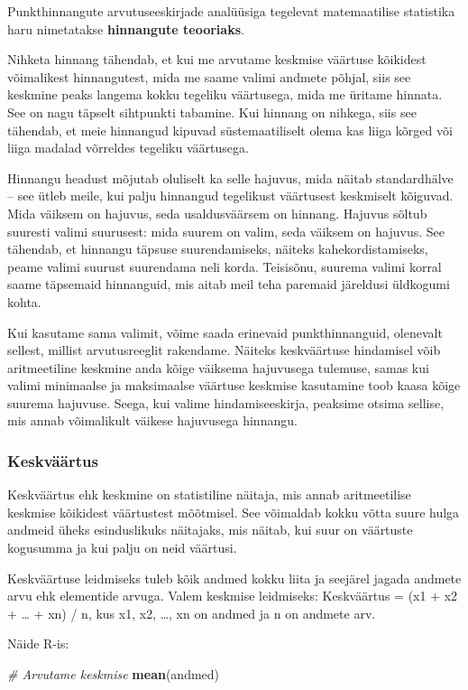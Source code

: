 \documentclass[
]{book}
\newenvironment{Shaded}{\begin{snugshade}}{\end{snugshade}}
\newcommand{\CommentTok}[1]{\textcolor[rgb]{0.56,0.35,0.01}{\textit{#1}}}
\newcommand{\FunctionTok}[1]{\textcolor[rgb]{0.13,0.29,0.53}{\textbf{#1}}}
\newcommand{\NormalTok}[1]{#1}
\renewenvironment{Shaded} {\begin{snugshade}\footnotesize} {\end{snugshade}}
\begin{document}
Punkthinnangute arvutuseeskirjade analüüsiga tegelevat matemaatilise statistika haru nimetatakse \textbf{hinnangute teooriaks}.

Nihketa hinnang tähendab, et kui me arvutame keskmise väärtuse kõikidest võimalikest hinnangutest, mida me saame valimi andmete põhjal, siis see keskmine peaks langema kokku tegeliku väärtusega, mida me üritame hinnata. See on nagu täpselt sihtpunkti tabamine. Kui hinnang on nihkega, siis see tähendab, et meie hinnangud kipuvad süstemaatiliselt olema kas liiga kõrged või liiga madalad võrreldes tegeliku väärtusega.

Hinnangu headust mõjutab oluliselt ka selle hajuvus, mida näitab standardhälve -- see ütleb meile, kui palju hinnangud tegelikust väärtusest keskmiselt kõiguvad. Mida väiksem on hajuvus, seda usaldusväärsem on hinnang. Hajuvus sõltub suuresti valimi suurusest: mida suurem on valim, seda väiksem on hajuvus. See tähendab, et hinnangu täpsuse suurendamiseks, näiteks kahekordistamiseks, peame valimi suurust suurendama neli korda. Teisisõnu, suurema valimi korral saame täpsemaid hinnanguid, mis aitab meil teha paremaid järeldusi üldkogumi kohta.

Kui kasutame sama valimit, võime saada erinevaid punkthinnanguid, olenevalt sellest, millist arvutusreeglit rakendame. Näiteks keskväärtuse hindamisel võib aritmeetiline keskmine anda kõige väiksema hajuvusega tulemuse, samas kui valimi minimaalse ja maksimaalse väärtuse keskmise kasutamine toob kaasa kõige suurema hajuvuse. Seega, kui valime hindamiseeskirja, peaksime otsima sellise, mis annab võimalikult väikese hajuvusega hinnangu.

\subsubsection{Keskväärtus}\label{keskvuxe4uxe4rtus}

Keskväärtus ehk keskmine on statistiline näitaja, mis annab aritmeetilise keskmise kõikidest väärtustest mõõtmisel. See võimaldab kokku võtta suure hulga andmeid üheks esinduslikuks näitajaks, mis näitab, kui suur on väärtuste kogusumma ja kui palju on neid väärtusi.

Keskväärtuse leidmiseks tuleb kõik andmed kokku liita ja seejärel jagada andmete arvu ehk elementide arvuga. Valem keskmise leidmiseks: Keskväärtus = (x1 + x2 + \ldots{} + xn) / n, kus x1, x2, \ldots, xn on andmed ja n on andmete arv.

Näide R-is:

\begin{Shaded}
\begin{Highlighting}[]
\CommentTok{\# Arvutame keskmise}
\FunctionTok{mean}\NormalTok{(andmed)}
\end{Highlighting}
\end{Shaded}
\end{document}
